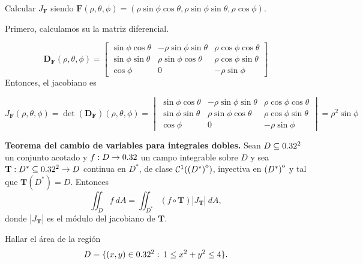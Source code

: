    \begin{example}  Calcular $J_\mathbf{F}$   siendo  \( \mathbf{F}(\rho, \theta, \phi)  = (\rho\sin\phi\cos\theta, \rho\sin\phi\sin\theta, \rho\cos\phi) \). 
   
   
    Primero, calculamos su la matriz diferencial.
   
    \[
    \boldsymbol{D}_{\mathbf{F}}(\rho, \theta, \phi) 
    =
    \begin{bmatrix}
    \sin\phi \cos\theta & -\rho \sin\phi \sin\theta & \rho \cos\phi \cos\theta \\
    \sin\phi \sin\theta & \rho \sin\phi \cos\theta & \rho \cos\phi \sin\theta \\
    \cos\phi & 0 & -\rho \sin\phi
    \end{bmatrix}
    \]
     Entonces, el jacobiano es 
    
    \[
    J_\mathbf{F}(\rho, \theta, \phi)  = \det(\boldsymbol{D}_{\mathbf{F}})(\rho, \theta, \phi)  = \begin{vmatrix}
        \sin\phi \cos\theta & -\rho \sin\phi \sin\theta & \rho \cos\phi \cos\theta \\
        \sin\phi \sin\theta & \rho \sin\phi \cos\theta & \rho \cos\phi \sin\theta \\
        \cos\phi & 0 & -\rho \sin\phi
        \end{vmatrix}=\rho^2 \sin\phi
    \]
    
    
    \end{example}

\begin{theorem} %
    \textbf{Teorema del cambio de variables para integrales dobles.}   Sean $D \subseteq0.32^2$ un conjunto acotado y  $f:D \to0.32$ un campo integrable sobre $D$   y sea $\mathbf{T}:D^*\subseteq0.32^2\to D$ continua en $D^*$,  de clase $\mathcal{C}^1({\kern0pt(D^*)}^{\mathrm{o}})$,  inyectiva en ${\kern0pt(D^*)}^{\mathrm{o}}$ y tal que $\mathbf{T}(D^*)=D$. Entonces
    \[
        \iint_D f\:dA=\iint_{D^*}(f\circ\mathbf{T})|J_\mathbf{T}|\:dA,
    \]
    donde $|J_\mathbf{T}|$ es el m\'odulo del jacobiano de $\mathbf{T}$.
\end{theorem}


 \begin{example} Hallar el \'area de la regi\'on $$ D=\{(x,y)\in0.32^2: \: 1 \leq x^{2}+ y^{2}  \leq4 \}.$$ 
 \end{example} 
